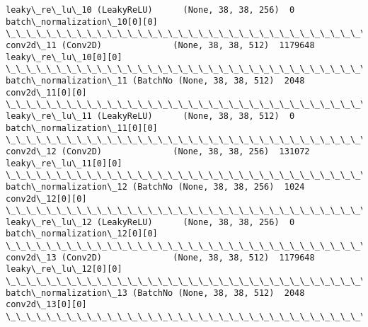 \documentclass[11pt]{article}
\begin{document}
\begin{Verbatim}[commandchars=\\\{\}]
leaky\_re\_lu\_10 (LeakyReLU)      (None, 38, 38, 256)  0           batch\_normalization\_10[0][0]     
\_\_\_\_\_\_\_\_\_\_\_\_\_\_\_\_\_\_\_\_\_\_\_\_\_\_\_\_\_\_\_\_\_\_\_\_\_\_\_\_\_\_\_\_\_\_\_\_\_\_\_\_\_\_\_\_\_\_\_\_\_\_\_\_\_\_\_\_\_\_\_\_\_\_\_\_\_\_\_\_\_\_\_\_\_\_\_\_\_\_\_\_\_\_\_\_\_\_
conv2d\_11 (Conv2D)              (None, 38, 38, 512)  1179648     leaky\_re\_lu\_10[0][0]             
\_\_\_\_\_\_\_\_\_\_\_\_\_\_\_\_\_\_\_\_\_\_\_\_\_\_\_\_\_\_\_\_\_\_\_\_\_\_\_\_\_\_\_\_\_\_\_\_\_\_\_\_\_\_\_\_\_\_\_\_\_\_\_\_\_\_\_\_\_\_\_\_\_\_\_\_\_\_\_\_\_\_\_\_\_\_\_\_\_\_\_\_\_\_\_\_\_\_
batch\_normalization\_11 (BatchNo (None, 38, 38, 512)  2048        conv2d\_11[0][0]                  
\_\_\_\_\_\_\_\_\_\_\_\_\_\_\_\_\_\_\_\_\_\_\_\_\_\_\_\_\_\_\_\_\_\_\_\_\_\_\_\_\_\_\_\_\_\_\_\_\_\_\_\_\_\_\_\_\_\_\_\_\_\_\_\_\_\_\_\_\_\_\_\_\_\_\_\_\_\_\_\_\_\_\_\_\_\_\_\_\_\_\_\_\_\_\_\_\_\_
leaky\_re\_lu\_11 (LeakyReLU)      (None, 38, 38, 512)  0           batch\_normalization\_11[0][0]     
\_\_\_\_\_\_\_\_\_\_\_\_\_\_\_\_\_\_\_\_\_\_\_\_\_\_\_\_\_\_\_\_\_\_\_\_\_\_\_\_\_\_\_\_\_\_\_\_\_\_\_\_\_\_\_\_\_\_\_\_\_\_\_\_\_\_\_\_\_\_\_\_\_\_\_\_\_\_\_\_\_\_\_\_\_\_\_\_\_\_\_\_\_\_\_\_\_\_
conv2d\_12 (Conv2D)              (None, 38, 38, 256)  131072      leaky\_re\_lu\_11[0][0]             
\_\_\_\_\_\_\_\_\_\_\_\_\_\_\_\_\_\_\_\_\_\_\_\_\_\_\_\_\_\_\_\_\_\_\_\_\_\_\_\_\_\_\_\_\_\_\_\_\_\_\_\_\_\_\_\_\_\_\_\_\_\_\_\_\_\_\_\_\_\_\_\_\_\_\_\_\_\_\_\_\_\_\_\_\_\_\_\_\_\_\_\_\_\_\_\_\_\_
batch\_normalization\_12 (BatchNo (None, 38, 38, 256)  1024        conv2d\_12[0][0]                  
\_\_\_\_\_\_\_\_\_\_\_\_\_\_\_\_\_\_\_\_\_\_\_\_\_\_\_\_\_\_\_\_\_\_\_\_\_\_\_\_\_\_\_\_\_\_\_\_\_\_\_\_\_\_\_\_\_\_\_\_\_\_\_\_\_\_\_\_\_\_\_\_\_\_\_\_\_\_\_\_\_\_\_\_\_\_\_\_\_\_\_\_\_\_\_\_\_\_
leaky\_re\_lu\_12 (LeakyReLU)      (None, 38, 38, 256)  0           batch\_normalization\_12[0][0]     
\_\_\_\_\_\_\_\_\_\_\_\_\_\_\_\_\_\_\_\_\_\_\_\_\_\_\_\_\_\_\_\_\_\_\_\_\_\_\_\_\_\_\_\_\_\_\_\_\_\_\_\_\_\_\_\_\_\_\_\_\_\_\_\_\_\_\_\_\_\_\_\_\_\_\_\_\_\_\_\_\_\_\_\_\_\_\_\_\_\_\_\_\_\_\_\_\_\_
conv2d\_13 (Conv2D)              (None, 38, 38, 512)  1179648     leaky\_re\_lu\_12[0][0]             
\_\_\_\_\_\_\_\_\_\_\_\_\_\_\_\_\_\_\_\_\_\_\_\_\_\_\_\_\_\_\_\_\_\_\_\_\_\_\_\_\_\_\_\_\_\_\_\_\_\_\_\_\_\_\_\_\_\_\_\_\_\_\_\_\_\_\_\_\_\_\_\_\_\_\_\_\_\_\_\_\_\_\_\_\_\_\_\_\_\_\_\_\_\_\_\_\_\_
batch\_normalization\_13 (BatchNo (None, 38, 38, 512)  2048        conv2d\_13[0][0]                  
\_\_\_\_\_\_\_\_\_\_\_\_\_\_\_\_\_\_\_\_\_\_\_\_\_\_\_\_\_\_\_\_\_\_\_\_\_\_\_\_\_\_\_\_\_\_\_\_\_\_\_\_\_\_\_\_\_\_\_\_\_\_\_\_\_\_\_\_\_\_\_\_\_\_\_\_\_\_\_\_\_\_\_\_\_\_\_\_\_\_\_\_\_\_\_\_\_\_

\end{Verbatim}
\end{document}
